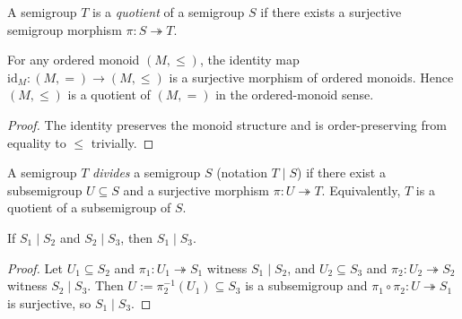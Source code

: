 \begin{definition}
\label{def:semigroup-quotient}
A semigroup \(T\) is a \emph{quotient} of a semigroup \(S\) if there exists a surjective semigroup morphism \(\pi:S\twoheadrightarrow T\).
\end{definition}

\begin{lemma}
\label{lem:ordered-monoid-is-quotient-of-equality}
For any ordered monoid \((M,\le)\), the identity map \(\mathrm{id}_M:(M,=)\to (M,\le)\) is a surjective morphism of ordered monoids. Hence \((M,\le)\) is a quotient of \((M,=)\) in the ordered-monoid sense.
\end{lemma}
\begin{proof}
The identity preserves the monoid structure and is order-preserving from equality to \(\le\) trivially.
\end{proof}

\begin{definition}
\label{def:division}
A semigroup \(T\) \emph{divides} a semigroup \(S\) (notation \(T \mid S\)) if there exist a subsemigroup \(U\subseteq S\) and a surjective morphism \(\pi:U\twoheadrightarrow T\). Equivalently, \(T\) is a quotient of a subsemigroup of \(S\).
\end{definition}

\begin{lemma}
\label{lem:division-transitive}
If \(S_1\mid S_2\) and \(S_2\mid S_3\), then \(S_1\mid S_3\).
\end{lemma}
\begin{proof}
Let \(U_1\subseteq S_2\) and \(\pi_1:U_1\twoheadrightarrow S_1\) witness \(S_1\mid S_2\), and \(U_2\subseteq S_3\) and \(\pi_2:U_2\twoheadrightarrow S_2\) witness \(S_2\mid S_3\). Then \(U:=\pi_2^{-1}(U_1)\subseteq S_3\) is a subsemigroup and \(\pi_1\circ \pi_2:U\twoheadrightarrow S_1\) is surjective, so \(S_1\mid S_3\).
\end{proof}

